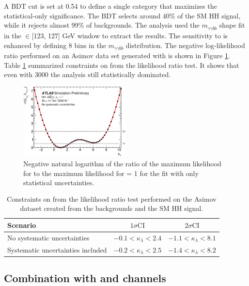 A BDT cut is set at 0.54 to define a single category that maximizes the statistical-only significance. The BDT selects around 40\% of the SM HH signal, while it rejects almost 99\% of backgrounds. The analysis used the $m_{\gamma\gamma\bar{b}b}$ shape fit in the \myy $\in$[123, 127] GeV window to extract the results. The sensitivity to \kl is enhanced by defining 8 bins in the $m_{\gamma\gamma\bar{b}b}$ distribution. The negative log-likelihood ratio performed on an Asimov data set generated with  is shown in Figure \ref{fig:HL-LHC:36ifb:LH}. Table \ref{tab:HL-LHC:36ifb:kl} summarized constraints on \kl from the likelihood ratio test. It shows that even with 3000 \ifb the analysis still statistically dominated.
\begin{figure}[htbp]
    \centering
    \includegraphics[width=0.5\textwidth]{Ch6/Img/figures_bbyy_NoSyst_likelihoodCurve_-3to10.eps}
    \caption{Negative natural logarithm of the ratio of the maximum likelihood for \kl to the maximum likelihood for \kl = 1 for the fit with only statistical uncertainties.}
    \label{fig:HL-LHC:36ifb:LH}
\end{figure}

\begin{table}[htbp]
    \centering
    \begin{tabular}{lcc}
\hline \hline Scenario & $1 \sigma \mathrm{CI}$ & $2 \sigma \mathrm{CI}$ \\
\hline No systematic uncertainties & $-0.1<\kappa_{\lambda}<2.4$ & $-1.1<\kappa_{\lambda}<8.1$ \\
Systematic uncertainties included & $-0.2<\kappa_{\lambda}<2.5$ & $-1.4<\kappa_{\lambda}<8.2$ \\
\hline \hline
\end{tabular}
    \caption{Constraints on \kl from the likelihood ratio test performed on the Asimov dataset created from the backgrounds and the SM HH signal.}
    \label{tab:HL-LHC:36ifb:kl}
\end{table}

\subsection{Combination with \bbbb and \bbtt channels}

